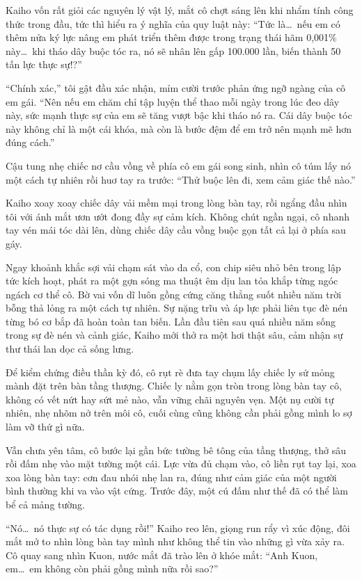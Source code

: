 ﻿\documentclass[../main.tex]{subfiles}
\begin{document}
Kaiho vốn rất giỏi các nguyên lý vật lý, mắt cô chợt sáng lên khi nhẩm tính công thức trong đầu, tức thì hiểu ra ý nghĩa của quy luật này: ``Tức là\dots\ nếu em có thêm nửa ký lực nâng em phát triển thêm được trong trạng thái hãm 0,001\% này\dots\ khi tháo dây buộc tóc ra, nó sẽ nhân lên gấp 100.000 lần, biến thành 50 tấn lực thực sự!?''

``Chính xác,'' tôi gật đầu xác nhận, mỉm cười trước phản ứng ngỡ ngàng của cô em gái. ``Nên nếu em chăm chỉ tập luyện thể thao mỗi ngày trong lúc đeo dây này, sức mạnh thực sự của em sẽ tăng vượt bậc khi tháo nó ra. Cái dây buộc tóc này không chỉ là một cái khóa, mà còn là bước đệm để em trở nên mạnh mẽ hơn đúng cách.''

Cậu tung nhẹ chiếc nơ cầu vồng về phía cô em gái song sinh, nhìn cô túm lấy nó một cách tự nhiên rồi huơ tay ra trước: ``Thử buộc lên đi, xem cảm giác thế nào.''

Kaiho xoay xoay chiếc dây vải mềm mại trong lòng bàn tay, rồi ngẩng đầu nhìn tôi với ánh mắt ươn ướt đong đầy sự cảm kích. Không chút ngần ngại, cô nhanh tay vén mái tóc dài lên, dùng chiếc dây cầu vồng buộc gọn tất cả lại ở phía sau gáy.

Ngay khoảnh khắc sợi vải chạm sát vào da cổ, con chip siêu nhỏ bên trong lập tức kích hoạt, phát ra một gợn sóng ma thuật êm dịu lan tỏa khắp từng ngóc ngách cơ thể cô. Bờ vai vốn dĩ luôn gồng cứng căng thẳng suốt nhiều năm trời bỗng thả lỏng ra một cách tự nhiên. Sự nặng trĩu và áp lực phải liên tục đè nén từng bó cơ bắp đã hoàn toàn tan biến. Lần đầu tiên sau quá nhiều năm sống trong sự đè nén và cảnh giác, Kaiho mới thở ra một hơi thật sâu, cảm nhận sự thư thái lan dọc cả sống lưng.

Để kiểm chứng điều thần kỳ đó, cô rụt rè đưa tay chụm lấy chiếc ly sứ mỏng mành đặt trên bàn tầng thượng. Chiếc ly nằm gọn tròn trong lòng bàn tay cô, không có vết nứt hay sứt mẻ nào, vẫn vững chãi nguyên vẹn. Một nụ cười tự nhiên, nhẹ nhõm nở trên môi cô, cuối cùng cũng không cần phải gồng mình lo sợ làm vỡ thứ gì nữa.

Vẫn chưa yên tâm, cô bước lại gần bức tường bê tông của tầng thượng, thở sâu rồi đấm nhẹ vào mặt tường một cái. Lực vừa đủ chạm vào, cô liền rụt tay lại, xoa xoa lòng bàn tay: cơn đau nhói nhẹ lan ra, đúng như cảm giác của một người bình thường khi va vào vật cứng. Trước đây, một cú đấm như thế đã có thể làm bể cả mảng tường.

``Nó\dots\ nó thực sự có tác dụng rồi!'' Kaiho reo lên, giọng run rẩy vì xúc động, đôi mắt mở to nhìn lòng bàn tay mình như không thể tin vào những gì vừa xảy ra. Cô quay sang nhìn Kuon, nước mắt đã trào lên ở khóe mắt: ``Anh Kuon, em\dots\ em không còn phải gồng mình nữa rồi sao?''
\end{document}
